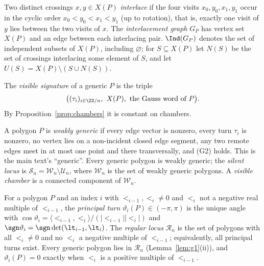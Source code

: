 \begin{definition}[interlacement]\label{def:interlace}\leanok
Two distinct crossings $x,y\in X(P)$ \emph{interlace} if the four visits
$x_0,y_0,x_1,y_1$ occur in the cyclic order $x_0<y_0<x_1<y_1$ (up to rotation),
that is, exactly one visit of $y$ lies between the two visits of $x$. The
\emph{interlacement graph} $G_P$ has vertex set $X(P)$ and an edge between
each interlacing pair. $\Ind(G_P)$ denotes the set of independent subsets of
$X(P)$, including $\varnothing$; for $S\subseteq X(P)$ let $N(S)$ be the set of
crossings interlacing some element of $S$, and let
$U(S)=X(P)\setminus(S\cup N(S))$.
\end{definition}

\begin{definition}\label{def:visible}\leanok
The \emph{visible signature} of a generic $P$ is the triple
\[
\bigl((\tau_i)_{i\in\ZZ/n},\ X(P),\ \text{the Gauss word of }P\bigr).
\]
By Proposition~\ref{prop:chambers} it is constant on chambers.
\end{definition}

\begin{definition}\label{def:weak}\leanok
A polygon $P$ is \emph{weakly generic} if every edge vector is nonzero, every
turn $\tau_i$ is nonzero, no vertex lies on a non-incident closed edge
segment, any two remote edges meet in at most one point and there
transversally, and (G2) holds. This is the main text's ``generic''. Every
generic polygon is weakly generic; the \emph{silent locus} is
$\mathcal S_n=\mathcal W_n\setminus\mathcal U_n$, where $\mathcal W_n$ is the
set of weakly generic polygons. A \emph{visible chamber} is a connected
component of $\mathcal W_n$.
\end{definition}

\begin{definition}\label{def:regular}\leanok
For a polygon $P$ and an index $i$ with $\lt_{i-1},\lt_i\neq0$ and $\lt_i$
not a negative real multiple of $\lt_{i-1}$, the \emph{principal turn}
$\vartheta_i(P)\in(-\pi,\pi)$ is the unique angle with
$\cos\vartheta_i=\langle\lt_{i-1},\lt_i\rangle/(|\lt_{i-1}||\lt_i|)$ and
$\sgn\vartheta_i=\sgn\det(\lt_{i-1},\lt_i)$. The \emph{regular locus}
$\mathcal R_n$ is the set of polygons with all $\lt_i\neq0$ and no $\lt_i$ a
negative multiple of $\lt_{i-1}$; equivalently, all principal turns exist.
Every generic polygon lies in $\mathcal R_n$ (Lemma~\ref{lem:g1}(ii)), and
$\vartheta_i(P)=0$ exactly when $\lt_i$ is a positive multiple of $\lt_{i-1}$.
\end{definition}

